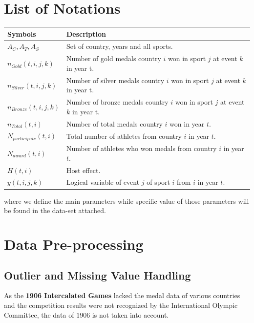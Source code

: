 \documentclass{mcmthesis}
\begin{document}
\section{List of Notations}
\begin{center}
\begin{tabular}{ll}
	\toprule
	{\bf Symbols} & {\bf Description}  \\
	\midrule 
	$A_{C},A_{T},A_{S}$ & Set of country, years and all sports.\\
	$n_{Gold}(t,i,j,k)$ & Number of gold medals country $i$ won in sport $j$ at event $k$ in year t. \\
	$n_{Silver}(t,i,j,k)$ & Number of silver medals country $i$ won in sport $j$ at event $k$ in year t. \\
	$n_{Bronze}(t,i,j,k)$ & Number of bronze medals country $i$ won in sport $j$ at event $k$ in year t. \\
	$n_{Total}(t,i)$ & Number of total medals country $i$ won in year $t$. \\
	$N_{participate}(t,i)$ & Total number of athletes from country $i$ in year $t$. \\
	$N_{award}(t,i)$ & Number of athletes who won medals from country $i$ in year $t$. \\
	$H(t,i)$ & Host effect. \\
	$y(t,i,j,k)$ &  Logical variable of event $j$ of sport $i$ from $i$ in year $t$. \\
	\bottomrule
\end{tabular}
\end{center}

\noindent where we define the main parameters while specific value of those 
parameters will be found in the data-set attached.











\section{Data Pre-processing}

\subsection{Outlier and Missing Value Handling}
As the \textbf{1906 Intercalated Games} lacked the medal data of various countries and the competition results were not recognized by the International Olympic Committee, the data of 1906 is not taken into account.
\end{document}
